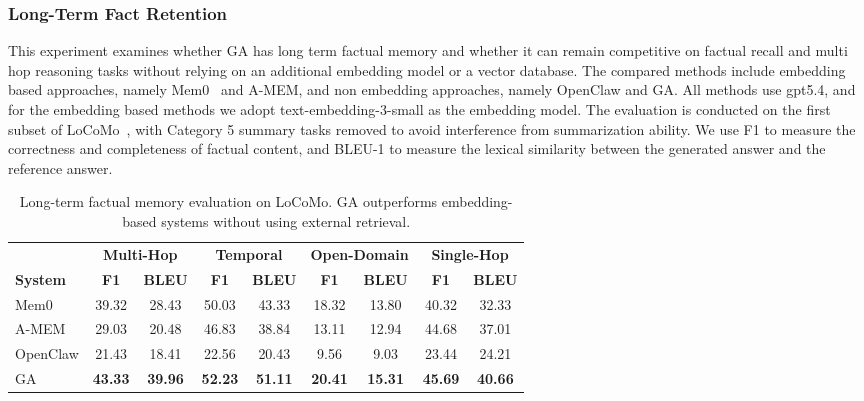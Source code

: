 \subsubsection{Long-Term Fact Retention}
\label{sec:exp_longterm_fact}

This experiment examines whether GA has long term factual memory and whether it can remain competitive on factual recall and multi hop reasoning tasks without relying on an additional embedding model or a vector database. 
The compared methods include embedding based approaches, namely Mem0~\citep{mem0} and A-MEM, and non embedding approaches, namely OpenClaw and GA. 
All methods use gpt5.4, and for the embedding based methods we adopt text-embedding-3-small as the embedding model. 
The evaluation is conducted on the first subset of LoCoMo~\citep{locomo}, with Category 5 summary tasks removed to avoid interference from summarization ability.
We use F1 to measure the correctness and completeness of factual content, and BLEU-1 to measure the lexical similarity between the generated answer and the reference answer.

\begin{table}[t]
\centering
\caption{Long-term factual memory evaluation on LoCoMo. GA outperforms embedding-based systems without using external retrieval.}
\label{tab:long_term_memory}
\begin{tabular}{lcccccccc}
\toprule
& \multicolumn{2}{c}{\textbf{Multi-Hop}} & \multicolumn{2}{c}{\textbf{Temporal}} & \multicolumn{2}{c}{\textbf{Open-Domain}} & \multicolumn{2}{c}{\textbf{Single-Hop}} \\
\cmidrule(lr){2-3} \cmidrule(lr){4-5} \cmidrule(lr){6-7} \cmidrule(lr){8-9}
\textbf{System} & \textbf{F1} & \textbf{BLEU} & \textbf{F1} & \textbf{BLEU} & \textbf{F1} & \textbf{BLEU} & \textbf{F1} & \textbf{BLEU} \\
\midrule
Mem0 & 39.32 & 28.43 & 50.03 & 43.33 & 18.32 & 13.80 & 40.32 & 32.33 \\
A-MEM & 29.03 & 20.48 & 46.83 & 38.84 & 13.11 & 12.94 & 44.68 & 37.01 \\
OpenClaw & 21.43 & 18.41 & 22.56 & 20.43 & 9.56 & 9.03 & 23.44 & 24.21 \\
GA & \textbf{43.33} & \textbf{39.96} & \textbf{52.23} & \textbf{51.11} & \textbf{20.41} & \textbf{15.31} & \textbf{45.69} & \textbf{40.66} \\
\bottomrule
\end{tabular}
\end{table}

